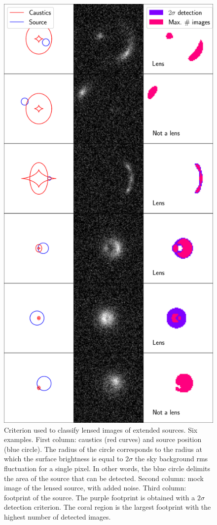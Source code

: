 \documentclass{aa}
\begin{document}
\begin{figure}
\includegraphics[width=\columnwidth]{example_detections.eps}
\caption{
Criterion used to classify lensed images of extended sources. Six examples.
First column: caustics (red curves) and source position (blue circle). The radius of the circle corresponds to the radius at which the surface brightness is equal to $2\sigma$ the sky background rms fluctuation for a single pixel. In other words, the blue circle delimits the area of the source that can be detected.
Second column: mock image of the lensed source, with added noise.
Third column: footprint of the source. The purple footprint is obtained with a $2\sigma$ detection criterion. The coral region is the largest footprint with the highest number of detected images.
\label{fig:lensdef}
}
\end{figure}
\end{document}
